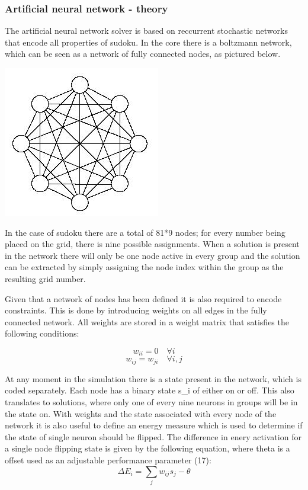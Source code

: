 \documentclass[a4paper,11pt]{kth-mag}
\begin{document}
\subsubsection{Artificial neural network - theory}
The artificial neural network solver is based on reccurrent stochastic networks that encode all properties of sudoku. In the core there is a boltzmann network, which can be seen as a network of fully connected nodes, as pictured below.

\includegraphics{images/neural1.png}

In the case of sudoku there are a total of 81*9 nodes; for every number being placed on the grid, there is nine possible assignments. When a solution is present in the network there will only be one node active in every group and the solution can be extracted by simply assigning the node index within the group as the resulting grid number.

Given that a network of nodes has been defined it is also required to encode constraints. This is done by introducing weights on all edges in the fully connected network. All weights are stored in a weight matrix that satisfies the following conditions:

\[
w_{ii} = 0 \quad \forall i
\]
\[
w_{ij} = w_{ji} \quad \forall i,j
\]

At any moment in the simulation there is a state present in the network, which is coded separately. Each node has a binary state s\_i of either on or off. This also translates to solutions, where only one of every nine neurons in groups will be in the state on. With weights and the state associated with every node of the network it is also useful to define an energy measure which is used to determine if the state of single neuron should be flipped. The difference in enery activation for a single node flipping state is given by the following equation, where theta is a offset used as an adjustable performance parameter (17):
\[
\Delta E_{i} = \sum_{j} w_{ij} s_{j} - \theta
\]
\end{document}
